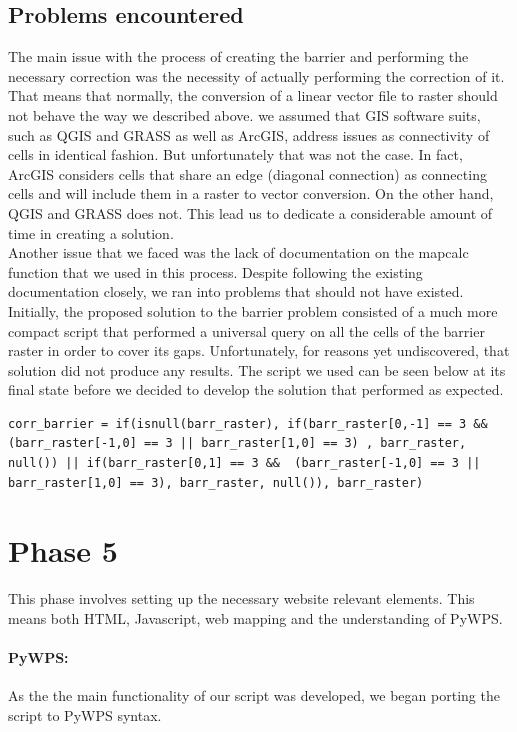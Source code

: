\subsection{Problems encountered}
The main issue with the process of creating the barrier and performing the necessary correction was the necessity of actually performing the correction of it. That means that normally, the conversion of a linear vector file to raster should not behave the way we described above. we assumed that GIS software suits, such as QGIS and GRASS as well as ArcGIS, address issues as connectivity of cells in identical fashion. But unfortunately that was not the case. In fact, ArcGIS considers cells that share an edge (diagonal connection) as connecting cells and will include them in a raster to vector conversion. On the other hand, QGIS and GRASS does not. This lead us to dedicate a considerable amount of time in creating a solution.\\

Another issue that we faced was the lack of documentation on the mapcalc function that we used in this process. Despite following the existing documentation closely, we ran into problems that should not have existed. Initially, the proposed solution to the barrier problem consisted of a much more compact script that performed a universal query on all the cells of the barrier raster in order to cover its gaps. Unfortunately, for reasons yet undiscovered, that solution did not produce any results. The script we used can be seen below at its final state before we decided to develop the solution that performed as expected.

\begin{lstlisting}
corr_barrier = if(isnull(barr_raster), if(barr_raster[0,-1] == 3 && (barr_raster[-1,0] == 3 || barr_raster[1,0] == 3) , barr_raster, null()) || if(barr_raster[0,1] == 3 &&  (barr_raster[-1,0] == 3 || barr_raster[1,0] == 3), barr_raster, null()), barr_raster)
\end{lstlisting}

\section{Phase 5}
This phase involves setting up the necessary website relevant elements. This means both HTML, Javascript, web mapping and the understanding of PyWPS.\\

\paragraph{PyWPS:} As the the main functionality of our script was developed, we began porting the script to PyWPS syntax. 

